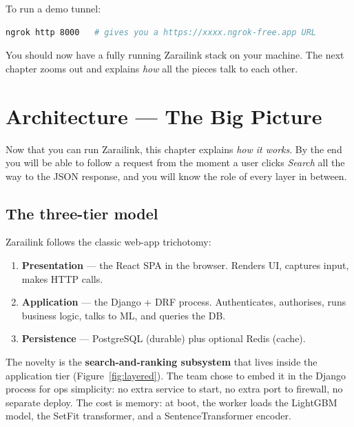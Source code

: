 \documentclass[11pt,a4paper,oneside]{book}
\begin{document}
To run a demo tunnel:

\begin{lstlisting}[language=Bash,caption={Public ngrok tunnel}]
ngrok http 8000   # gives you a https://xxxx.ngrok-free.app URL
\end{lstlisting}

You should now have a fully running Zarailink stack on your machine.
The next chapter zooms out and explains \emph{how} all the pieces talk
to each other.

\chapter{Architecture --- The Big Picture}
\label{ch:arch}

Now that you can run Zarailink, this chapter explains \emph{how it works}.
By the end you will be able to follow a request from the moment a user
clicks \emph{Search} all the way to the JSON response, and you will know
the role of every layer in between.

\section{The three-tier model}

Zarailink follows the classic web-app trichotomy:

\begin{enumerate}
  \item \textbf{Presentation} --- the React SPA in the browser. Renders
        UI, captures input, makes HTTP calls.
  \item \textbf{Application} --- the Django + DRF process. Authenticates,
        authorises, runs business logic, talks to ML, and queries the DB.
  \item \textbf{Persistence} --- PostgreSQL (durable) plus optional Redis
        (cache).
\end{enumerate}

The novelty is the \textbf{search-and-ranking subsystem} that lives inside
the application tier (Figure~\ref{fig:layered}). The team chose to embed it
in the Django process for ops simplicity: no extra service to start, no
extra port to firewall, no separate deploy. The cost is memory: at boot,
the worker loads the LightGBM model, the SetFit transformer, and a
SentenceTransformer encoder.
\end{document}
